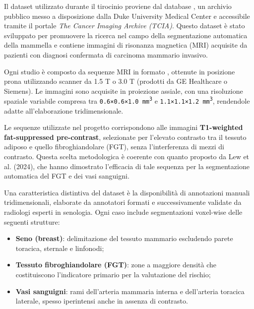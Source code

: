 

Il dataset utilizzato durante il tirocinio proviene dal database  \cite{duke_breast_mri}, un archivio pubblico messo a disposizione dalla Duke University Medical Center e accessibile tramite il portale \textit{The Cancer Imaging Archive (TCIA)}. Questo dataset è stato sviluppato per promuovere la ricerca nel campo della segmentazione automatica della mammella e contiene immagini di risonanza magnetica (MRI) acquisite da pazienti con diagnosi confermata di carcinoma mammario invasivo.

Ogni studio è composto da sequenze MRI in formato , ottenute in posizione prona utilizzando scanner da 1.5 T o 3.0 T (prodotti da GE Healthcare o Siemens). Le immagini sono acquisite in proiezione assiale, con una risoluzione spaziale variabile compresa tra \texttt{0.6×0.6×1.0 mm\textsuperscript{3}} e \texttt{1.1×1.1×1.2 mm\textsuperscript{3}}, rendendole adatte all'elaborazione tridimensionale.

Le sequenze utilizzate nel progetto corrispondono alle immagini \textbf{T1-weighted fat-suppressed pre-contrast}, selezionate per l’elevato contrasto tra il tessuto adiposo e quello fibroghiandolare (FGT), senza l’interferenza di mezzi di contrasto. Questa scelta metodologica è coerente con quanto proposto da Lew et al. (2024), che hanno dimostrato l’efficacia di tale sequenza per la segmentazione automatica del FGT e dei vasi sanguigni.


Una caratteristica distintiva del dataset è la disponibilità di annotazioni manuali tridimensionali, elaborate da annotatori formati e successivamente validate da radiologi esperti in senologia. Ogni caso include segmentazioni voxel-wise delle seguenti strutture:
\begin{itemize}
\item \textbf{Seno (breast)}: delimitazione del tessuto mammario escludendo parete toracica, sternale e linfonodi;
\item \textbf{Tessuto fibroghiandolare (FGT)}: zone a maggiore densità che costituiscono l’indicatore primario per la valutazione del rischio;
\item \textbf{Vasi sanguigni}: rami dell’arteria mammaria interna e dell’arteria toracica laterale, spesso iperintensi anche in assenza di contrasto.
\end{itemize}


